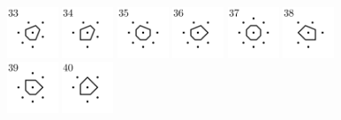 \documentclass[text.tex]{subfiles}
\begin{document}
\begin{figure}[h!]
\includegraphics[width=0.1363\textwidth]{img/results/octagon_concat/octagon_100000_(1_0alpha_1)_033.pdf}
\includegraphics[width=0.1363\textwidth]{img/results/octagon_concat/octagon_100000_(1_0alpha_1)_034.pdf}
\includegraphics[width=0.1363\textwidth]{img/results/octagon_concat/octagon_100000_(1_0alpha_1)_035.pdf}
\includegraphics[width=0.1363\textwidth]{img/results/octagon_concat/octagon_100000_(1_0alpha_1)_036.pdf}
\includegraphics[width=0.1363\textwidth]{img/results/octagon_concat/octagon_100000_(1_0alpha_1)_037.pdf}
\includegraphics[width=0.1363\textwidth]{img/results/octagon_concat/octagon_100000_(1_0alpha_1)_038.pdf}
\includegraphics[width=0.1363\textwidth]{img/results/octagon_concat/octagon_100000_(1_0alpha_1)_039.pdf}
\includegraphics[width=0.1363\textwidth]{img/results/octagon_concat/octagon_100000_(1_0alpha_1)_040.pdf}

\end{figure}
\end{document}
